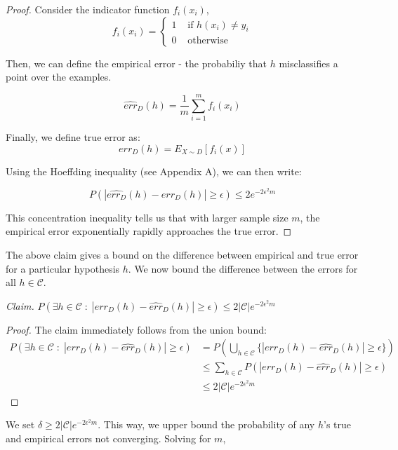 \documentclass{article}
\begin{document}
\begin{proof}
    Consider the indicator function $f_i(x_i)$,
    $$f_i(x_i) = \begin{cases}
        1&\text{ if $h(x_i) \neq y_i$}\\
        0&\text{ otherwise}
    \end{cases}$$

    Then, we can define the empirical error - the probabiliy that $h$
    misclassifies a point over the examples.

    $$\hat{err}_D(h) = \frac{1}{m}\sum_{i=1}^m f_i(x_i)$$

    Finally, we define true error as: $$err_D(h) = E_{X\sim D}[f_i(x)]$$

    Using the Hoeffding inequality (see Appendix A), we can then write:

    $$P(|\hat{err_D}(h) - err_D(h)| \geq \epsilon) \leq 2 e^{-2\epsilon^2 m}$$

    This concentration inequality tells us that with larger sample size
    $m$, the empirical error exponentially rapidly approaches the true
    error.

\end{proof}

The above claim gives a bound on the difference between empirical and
true error for a particular hypothesis $h$. We now bound the difference
between the errors for all $h \in \mathcal{C}$.

\emph{Claim.} $P(\exists h \in \mathcal{C}\;:\; |err_D(h) - \hat{err}_D(h)| \geq \epsilon) \leq 2 |\mathcal{C}|e^{-2\epsilon^2 m}$

\begin{proof}
    The claim immediately follows from the union bound:
    \begin{align*}
        P(\exists h \in \mathcal{C}\;:\; |err_D(h) - \hat{err}_D(h)|
        \geq \epsilon) &= P(\bigcup_{h\in\mathcal{C}} \bigg\{ |err_D(h)
        - \hat{err}_D(h)| \geq \epsilon \bigg\})\\
        &\leq \sum_{h\in \mathcal{C}} P(|err_D(h) - \hat{err}_D(h)| \geq \epsilon)\\
        &\leq 2|\mathcal{C}|e^{-2\epsilon^2 m}
    \end{align*}
\end{proof}

We set $\delta \geq 2|\mathcal{C}|e^{-2\epsilon^2 m}$. This way, we
upper bound the probability of any $h$'s true and empirical errors not
converging. Solving for $m$,
\end{document}

